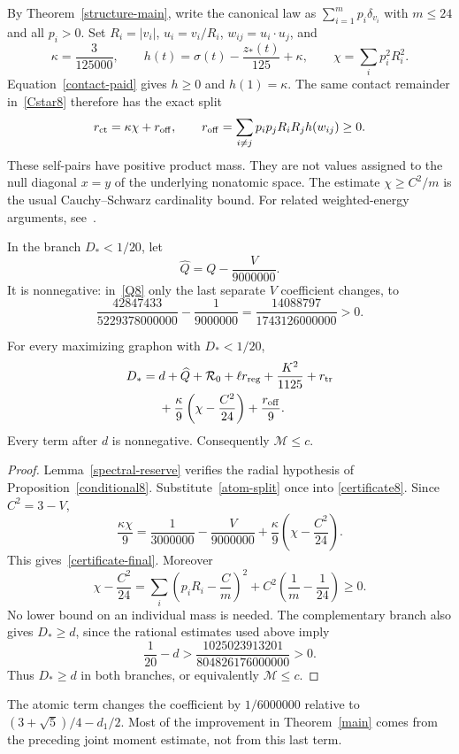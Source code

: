 By Theorem~\ref{structure-main}, write the canonical law as
$\sum_{i=1}^m p_i\delta_{v_i}$ with $m\le24$ and all $p_i>0$.
Set $R_i=|v_i|$, $u_i=v_i/R_i$, $w_{ij}=u_i\cdot u_j$, and
\[
 \kappa=\frac3{125000},\qquad
 h(t)=\sigma(t)-\frac{z_*(t)}{125}+\kappa,
 \qquad \chi=\sum_i p_i^2R_i^2.
\]
Equation~\eqref{contact-paid} gives $h\ge0$ and $h(1)=\kappa$.
The same contact remainder in~\eqref{Cstar8} therefore has the exact split
\begin{equation}\label{atom-split}
 r_{\rm ct}=\kappa\chi+r_{\rm off},\qquad
 r_{\rm off}=\sum_{i\ne j}p_ip_jR_iR_jh(w_{ij})\ge0.
\end{equation}
These self-pairs have positive product mass. They are not values assigned
to the null diagonal $x=y$ of the underlying nonatomic space.
The estimate $\chi\ge C^2/m$ is the usual Cauchy--Schwarz
cardinality bound. For related weighted-energy arguments,
see~\cite[Theorem 2.1 and the subsequent discussion]{Weighted}.

In the branch $D_*<1/20$, let
\[
 \widehat Q=Q-\frac{V}{9000000}.
\]
It is nonnegative: in~\eqref{Q8} only the last separate $V$ coefficient
changes, to
\[
 \frac{42847433}{5229378000000}-\frac1{9000000}
       =\frac{14088797}{1743126000000}>0.
\]
\begin{proposition}\label{final-certificate}
For every maximizing graphon with $D_*<1/20$,
\begin{align}\label{certificate-final}
 D_*={}&d+\widehat Q+{\cal R}_0+\ell r_{\rm reg}
       +\frac{K^2}{1125}+r_{\rm tr}\notag\\
 &+\frac{\kappa}{9}\left(\chi-\frac{C^2}{24}\right)
       +\frac{r_{\rm off}}9.
\end{align}
Every term after $d$ is nonnegative. Consequently $\mathcal M\le c$.
\end{proposition}
\begin{proof}
Lemma~\ref{spectral-reserve} verifies the radial hypothesis of
Proposition~\ref{conditional8}. Substitute~\eqref{atom-split} once into
\eqref{certificate8}. Since $C^2=3-V$,
\[
 \frac{\kappa\chi}{9}
 =\frac1{3000000}-\frac{V}{9000000}
       +\frac{\kappa}{9}\left(\chi-\frac{C^2}{24}\right).
\]
This gives~\eqref{certificate-final}. Moreover
\[
 \chi-\frac{C^2}{24}
 =\sum_i\left(p_iR_i-\frac Cm\right)^2
       +C^2\left(\frac1m-\frac1{24}\right)\ge0.
\]
No lower bound on an individual mass is needed. The complementary branch
also gives $D_*\ge d$, since the rational estimates used above imply
\[
 \frac1{20}-d>
       \frac{1025023913201}{804826176000000}>0.
\]
Thus $D_*\ge d$ in both branches, or equivalently $\mathcal M\le c$.
\end{proof}
The atomic term changes the coefficient by $1/6000000$ relative to
$(3+\sqrt5)/4-d_1/2$. Most of the improvement in Theorem~\ref{main}
comes from the preceding joint moment estimate, not from this last term.
